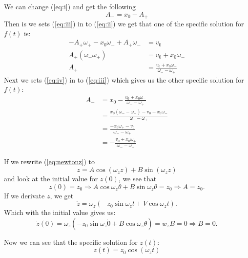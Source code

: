 \documentclass[english,notitlepage,reprint,nofootinbib]{revtex4-1}  %
\begin{document}
	We can change (\ref{eq:i}) and get the following
	\begin{equation} \label{eq:iii}
		A_- = x_0 - A_+
	\end{equation}
	Then is we sets (\ref{eq:iii}) in to (\ref{eq:ii}) we get that one of the specific solution for $f(t)$ is:
	\begin{align} \label{eq:iv}
		-A_+ \omega_+ - x_0 \omega_- + A_+ \omega_- &= v_0 \nonumber \\
		A_+ (\omega_- \omega_+) &= v_0 + x_0 \omega_- \nonumber \\
		A_+ &= \frac{v_0 + x_0 \omega_-}{\omega_- - \omega_+}
	\end{align}
	Next we sets (\ref{eq:iv}) in to (\ref{eq:iii}) which gives us the other specific solution for $f(t)$:
	\begin{align*}
		A_- &= x_0 - \frac{v_0 + x_0 \omega_-}{\omega_- - \omega_+} \\
		&= \frac{x_0 (\omega_- - \omega_+) - v_0 - x_0 \omega_-}{\omega_- - \omega_+} \\
		&= \frac{-x_0 \omega_+ - v_0}{\omega_- - \omega_+} \\
		&= - \frac{v_0 + x_0 \omega_+}{\omega_- - \omega_+}
	\end{align*}

	If we rewrite (\ref{eq:newtonz}) to 
	\begin{equation*}
		z = A \cos (\omega_z z) + B \sin (\omega_z z)
	\end{equation*}
	and look at the initial value for $z(0)$, we see that
	\begin{equation*}
		z(0) = z_0 \Rightarrow A \cos \omega_z \theta + B \sin \omega_z \theta = z_0 \Rightarrow A = z_0.
	\end{equation*}
	If we derivate $z$, we get 
	\begin{equation*}
		\dot{z} = \omega_z (-z_0 \sin \omega_z t + V \cos \omega_z t).
	\end{equation*}
	Which with the initial value gives us:
	\begin{equation*}
		\dot{z}(0) = \omega_z (- z_0 \sin \omega_z \dot 0 + B \cos \omega_z \theta) = w_z B = 0 \Rightarrow B = 0.
	\end{equation*}

	Now we can see that the specific solution for $z(t)$:
	\begin{equation*}
		z(t) = z_0 \cos (\omega_z t)
	\end{equation*}

	\onecolumngrid
	
	
	
	
\end{document}
